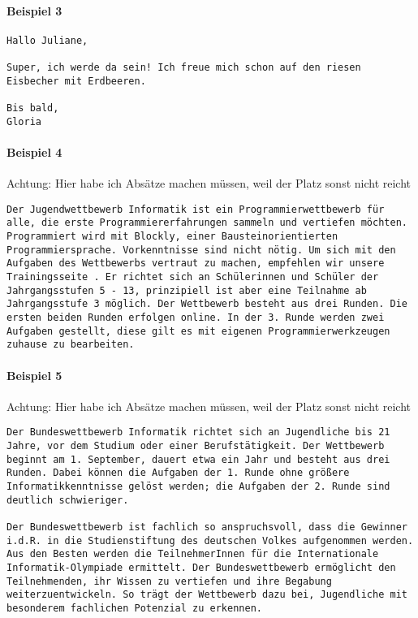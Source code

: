 \documentclass[a4paper,10pt,ngerman]{scrartcl}
\begin{document}
\paragraph{Beispiel 3}\mbox{}
\begin{lstlisting}[frame=tb]
Hallo Juliane,

Super, ich werde da sein! Ich freue mich schon auf den riesen Eisbecher mit Erdbeeren.

Bis bald,
Gloria
\end{lstlisting}
\paragraph{Beispiel 4}
Achtung: Hier habe ich Absätze machen müssen, weil der Platz sonst nicht reicht 
\begin{lstlisting}[frame=tb,breaklines=true]
Der Jugendwettbewerb Informatik ist ein Programmierwettbewerb für alle, die erste Programmiererfahrungen sammeln und vertiefen möchten. Programmiert wird mit Blockly, einer Bausteinorientierten Programmiersprache. Vorkenntnisse sind nicht nötig. Um sich mit den Aufgaben des Wettbewerbs vertraut zu machen, empfehlen wir unsere Trainingsseite . Er richtet sich an Schülerinnen und Schüler der Jahrgangsstufen 5 - 13, prinzipiell ist aber eine Teilnahme ab Jahrgangsstufe 3 möglich. Der Wettbewerb besteht aus drei Runden. Die ersten beiden Runden erfolgen online. In der 3. Runde werden zwei Aufgaben gestellt, diese gilt es mit eigenen Programmierwerkzeugen zuhause zu bearbeiten.
\end{lstlisting}
\paragraph{Beispiel 5}
Achtung: Hier habe ich Absätze machen müssen, weil der Platz sonst nicht reicht 
\begin{lstlisting}[frame=tb,breaklines=true]
Der Bundeswettbewerb Informatik richtet sich an Jugendliche bis 21 Jahre, vor dem Studium oder einer Berufstätigkeit. Der Wettbewerb beginnt am 1. September, dauert etwa ein Jahr und besteht aus drei Runden. Dabei können die Aufgaben der 1. Runde ohne größere Informatikkenntnisse gelöst werden; die Aufgaben der 2. Runde sind deutlich schwieriger.

Der Bundeswettbewerb ist fachlich so anspruchsvoll, dass die Gewinner i.d.R. in die Studienstiftung des deutschen Volkes aufgenommen werden. Aus den Besten werden die TeilnehmerInnen für die Internationale Informatik-Olympiade ermittelt. Der Bundeswettbewerb ermöglicht den Teilnehmenden, ihr Wissen zu vertiefen und ihre Begabung weiterzuentwickeln. So trägt der Wettbewerb dazu bei, Jugendliche mit besonderem fachlichen Potenzial zu erkennen.
\end{lstlisting}
\end{document}
